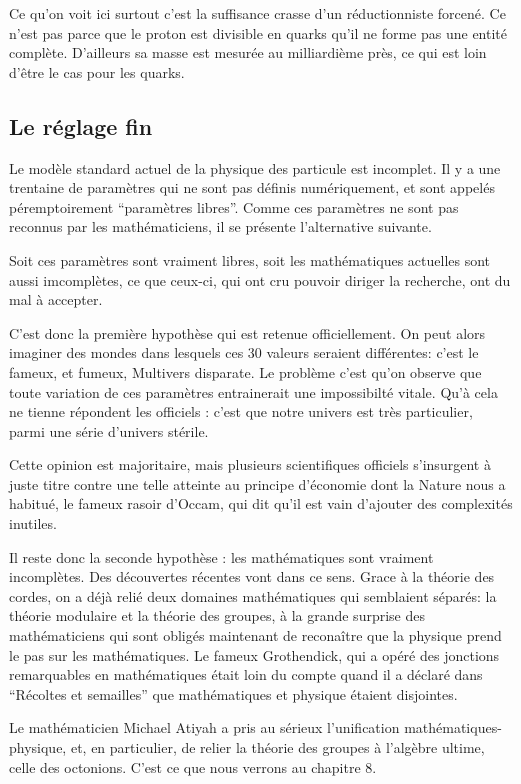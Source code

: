 \documentclass[a4paper,12pt]{article}
\begin{document}
Ce qu'on voit ici surtout c'est la suffisance crasse d'un réductionniste forcené. Ce n'est pas parce que le proton est divisible en quarks qu'il ne forme pas une entité complète. D'ailleurs sa masse est mesurée au milliardième près, ce qui est loin d'être le cas pour les quarks.



\subsection{Le réglage fin}

Le modèle standard actuel de la physique des particule est incomplet. Il y a une trentaine de paramètres qui ne sont pas définis numériquement, et sont appelés péremptoirement ``paramètres libres''. Comme ces paramètres ne sont pas reconnus par les mathématiciens, il se présente l'alternative suivante. 


Soit ces paramètres sont vraiment libres, soit les mathématiques actuelles sont aussi imcomplètes, ce que ceux-ci, qui ont cru pouvoir diriger la recherche, ont du mal à accepter.

C'est donc la première hypothèse qui est retenue officiellement. On peut alors imaginer des mondes dans lesquels ces 30 valeurs seraient différentes: c'est le fameux, et fumeux, Multivers disparate. Le problème c'est qu'on observe que toute variation de ces paramètres entrainerait une impossibilté vitale. Qu'à cela ne tienne répondent les officiels : c'est que notre univers est très particulier, parmi une série d'univers stérile.

Cette opinion est majoritaire, mais plusieurs scientifiques officiels s'insurgent à juste titre contre une telle atteinte au principe d'économie dont la Nature nous a habitué, le fameux rasoir d'Occam, qui dit qu'il est vain d'ajouter des complexités inutiles. 

Il reste donc la seconde hypothèse : les mathématiques sont vraiment incomplètes. Des découvertes récentes vont dans ce sens. Grace à la théorie des cordes, on a déjà relié deux domaines mathématiques qui semblaient séparés: la théorie modulaire et la théorie des groupes, à la grande surprise des mathématiciens qui sont obligés maintenant de reconaître que la physique prend le pas sur les mathématiques. Le fameux Grothendick, qui a opéré des jonctions remarquables en mathématiques était loin du compte quand il a déclaré dans ``Récoltes et semailles'' que mathématiques et physique étaient disjointes.

Le mathématicien Michael Atiyah a pris au sérieux l'unification mathématiques-physique, et, en particulier, de relier la théorie des groupes à l'algèbre ultime, celle des octonions. C'est ce que nous verrons au chapitre 8. 
\end{document}
